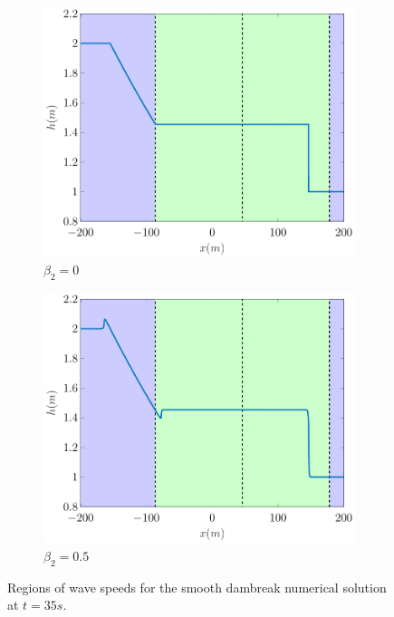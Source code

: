 \documentclass[10pt]{article}
\begin{document}
\begin{figure}
	\centering
	\begin{subfigure}{0.49\textwidth}
		\centering
		\includegraphics[width=\textwidth]{./Figures/Simulations/Study/RegSWWE/Regions/hRegionsSWWE.pdf}
		\caption{$\beta_2 = 0$}
	\end{subfigure}
	\begin{subfigure}{0.49\textwidth}
		\centering
		\includegraphics[width=\textwidth]{./Figures/Simulations/Study/RegSWWE/Regions/hRegionsREGSWWE.pdf}
		\caption{$\beta_2 = 0.5$}
	\end{subfigure}
	\caption{Regions of wave speeds for the smooth dambreak numerical solution at $t=35s$.}
\end{figure}
\end{document}
